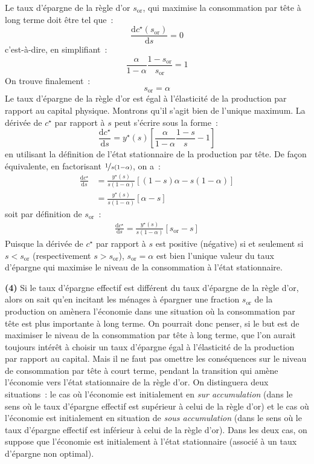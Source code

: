 \documentclass[10pt,a4paper,notitlepage]{report}
\newcommand{\question}[1]{\textbf{(#1)}}
\begin{document}
Le taux d'épargne de la  règle d'or $s_{\mathrm{or}}$, qui maximise la
consommation par tête à long terme doit être tel que :
\[
\frac{\mathrm dc^{\star}(s_{\mathrm{or}})}{\mathrm d s} = 0
\]
c'est-à-dire, en simplifiant :
\[
\frac{\alpha}{1-\alpha}\frac{1-s_{\mathrm{or}}}{s_{\mathrm{or}}}=1
\]
On trouve finalement :
\[
s_{\mathrm{or}} = \alpha
\]
Le  taux d'épargne  de la  règle d'or  est égal  à l'élasticité  de la
production par rapport au capital physique. Montrons qu'il s'agit bien
de l'unique maximum. La dérivée de  $c^{\star}$ par rapport à $s$ peut
s'écrire sous la forme :
\[
\frac{\mathrm dc^{\star}}{\mathrm d s} = y^{\star}(s)
\left[\frac{\alpha}{1-\alpha}\frac{1-s}{s}-1\right]
\]
en utilisant la définition de l'état stationnaire de la production par
tête.       De      façon       équivalente,      en       factorisant
$\nicefrac{1}{s(1-\alpha)}$, on a :
\[
\begin{split}
\frac{\mathrm dc^{\star}}{\mathrm d s} &= \frac{y^{\star}(s)}{s(1-\alpha)}
\left[(1-s)\alpha-s(1-\alpha)\right] \\
 &= \frac{y^{\star}(s)}{s(1-\alpha)}
\left[\alpha-s\right]
\end{split}
\]
soit par définition de $s_{\mathrm{or}}$ :
\[
\begin{split}
\frac{\mathrm dc^{\star}}{\mathrm d s} = \frac{y^{\star}(s)}{s(1-\alpha)}
\left[s_{\mathrm{or}}-s\right]
\end{split}
\]
Puisque  la dérivée  de $c^{\star}$  par  rapport à  $s$ est  positive
(négative)  si  et  seulement si  $s<s_{\mathrm{or}}$  (respectivement
$s>s_{\mathrm{or}}$),   $s_{\mathrm{or}}=\alpha$  est   bien  l'unique
valeur du taux  d'épargne qui maximise le niveau de  la consommation à
l'état stationnaire.\newline

\question{4}  Si le  taux  d'épargne effectif  est  différent du  taux
d'épargne de la règle d'or, alors on sait qu'en incitant les ménages à
épargner une  fraction $s_{\mathrm{or}}$  de la production  on amènera
l'économie dans  une situation  où la consommation  par tête  est plus
importante à  long terme. On  pourrait donc penser,  si le but  est de
maximiser le niveau de la consommation par tête à long terme, que l'on
aurait  toujours   intérêt  à  choisir   un  taux  d'épargne   égal  à
l'élasticité de la production par rapport  au capital. Mais il ne faut
pas omettre les conséquences sur le  niveau de consommation par tête à
court terme,  pendant la transition  qui amène l'économie  vers l'état
stationnaire de la règle d'or. On distinguera deux situations : le cas
où l'économie  est initialement en \textit{sur  accumulation} (dans le
sens où le  taux d'épargne effectif est supérieur à  celui de la règle
d'or)  et  le cas  où  l'économie  est  initialement en  situation  de
\textit{sous accumulation} (dans le sens où le taux d'épargne effectif
est inférieur à celui de la règle d'or). Dans les deux cas, on suppose
que l'économie  est initialement à  l'état stationnaire (associé  à un
taux d'épargne non optimal).\newline
\end{document}
